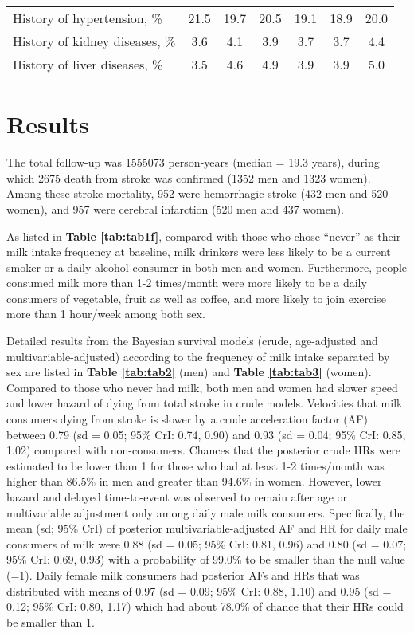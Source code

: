 \documentclass[nutrients,article,submitted,moreauthors,pdftex]{mdpi}
\providecommand{\DIFaddendFL}{} %
\DeclareRobustCommand{\DIFaddendFL}{\DIFOaddendFL \let\includegraphics\DIFOincludegraphics} %
\begin{document}
\begin{table}[h]
{\begin{tabular}[t]{lcccccc}
\hspace{1em}History of hypertension, \% & 21.5 & 19.7 & 20.5 & 19.1 & 18.9 & 20.0\\
\rowcolor{gray!6}  \hspace{1em}History of kidney diseases, \% & 3.6 & 4.1 & 3.9 & 3.7 & 3.7 & 4.4\\
\hspace{1em}History of liver diseases, \% & 3.5 & 4.6 & 4.9 & 3.9 & 3.9 & 5.0\\
\bottomrule
\end{tabular}}
\DIFaddendFL \end{table}

\hypertarget{results}{%
\section{Results}\label{results}}

The total follow-up was 1555073 person-years (median = 19.3 years),
during which 2675 death from stroke was confirmed (1352 men and 1323
women). Among these stroke mortality, 952 were hemorrhagic stroke (432
men and 520 women), and 957 were cerebral infarction (520 men and 437
women).

As listed in \textbf{Table \ref{tab:tab1f}}, compared with those who
chose ``never'' as their milk intake frequency at baseline, milk
drinkers were less likely to be a current smoker or a daily alcohol
consumer in both men and women. Furthermore, people consumed milk more
than 1-2 times/month were more likely to be a daily consumers of
vegetable, fruit as well as coffee, and more likely to join exercise
more than 1 hour/week among both sex.

Detailed results from the Bayesian survival models (crude, age-adjusted
and multivariable-adjusted) according to the frequency of milk intake
separated by sex are listed in \textbf{Table \ref{tab:tab2}} (men) and
\textbf{Table \ref{tab:tab3}} (women). Compared to those who never had
milk, both men and women had slower speed and lower hazard of dying from
total stroke in crude models. Velocities that milk consumers dying from
stroke is slower by a crude acceleration factor (AF) between 0.79 (sd =
0.05; 95\% CrI: 0.74, 0.90) and 0.93 (sd = 0.04; 95\% CrI: 0.85, 1.02)
compared with non-consumers. Chances that the posterior crude HRs were
estimated to be lower than 1 for those who had at least 1-2 times/month
was higher than 86.5\% in men and greater than 94.6\% in women. However,
lower hazard and delayed time-to-event was observed to remain after age
or multivariable adjustment only among daily male milk consumers.
Specifically, the mean (sd; 95\% CrI) of posterior
multivariable-adjusted AF and HR for daily male consumers of milk were
0.88 (sd = 0.05; 95\% CrI: 0.81, 0.96) and 0.80 (sd = 0.07; 95\% CrI:
0.69, 0.93) with a probability of 99.0\% to be smaller than the null
value (=1). Daily female milk consumers had posterior AFs and HRs that
was distributed with means of 0.97 (sd = 0.09; 95\% CrI: 0.88, 1.10) and
0.95 (sd = 0.12; 95\% CrI: 0.80, 1.17) which had about 78.0\% of chance
that their HRs could be smaller than 1.
\end{document}
